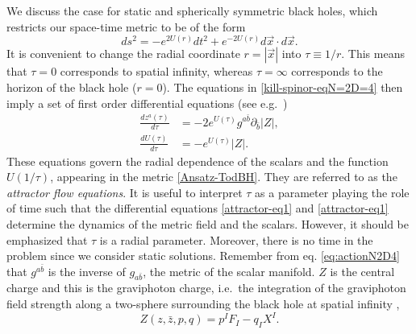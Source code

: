 \documentclass[12pt,twoside]{book}
\begin{document}
We discuss the case for static and spherically symmetric black holes, which restricts our space-time metric to be of the form \cite{Tod:1983}
\begin{equation}\label{Ansatz-TodBH}
ds^{2} = -e^{2U(r)}dt^{2} + e^{-2U(r)}d\vec{x}\cdot d\vec{x}.
\end{equation}
It is convenient to change the radial coordinate $r = |\vec{x}|$ into $\tau \equiv 1/r$. This means that $\tau = 0$ corresponds to spatial infinity, whereas $\tau = \infty$ corresponds to the horizon of the black hole ($r = 0$).
The equations in \eqref{kill-spinor-eqN=2D=4} then imply a set of first order differential equations \cite{Ferrara:bh} (see e.g.\ \cite{string-bbs})
\begin{align}
\frac{d z^{a}(\tau)}{d\tau} &= -2e^{U(\tau)}g^{a \bar{b}}\partial_{\bar{b}}|Z|, \label{attractor-eq1}\\
\frac{d U(\tau)}{d\tau} &= -e^{U(\tau)}|Z|. \label{attractor-eq2}
\end{align}
These equations govern the radial dependence of the scalars and the function $U(1/\tau)$, appearing in the metric \eqref{Ansatz-TodBH}. They are referred to as the \emph{attractor flow equations}. It is useful to interpret $\tau$ as a parameter playing the role of time such that the differential equations \eqref{attractor-eq1} and \eqref{attractor-eq1} determine the dynamics of the metric field and the scalars. However, it should be emphasized that $\tau$ is a radial parameter. Moreover, there is no time in the problem since we consider static solutions.
Remember from eq. \eqref{eq:actionN2D4} that $g^{a\bar{b}}$ is the inverse of $g_{a\bar{b}}$, the metric of the scalar manifold. $Z$ is the central charge and this is the graviphoton charge, i.e.\ the integration of the graviphoton field strength along a two-sphere surrounding the black hole at spatial infinity \cite{Ceresole:1995fk},
\begin{equation}
Z(z,\bar{z},p,q) = p^{I}F_{I} - q_{I}X^{I}.
\end{equation}
\end{document}
